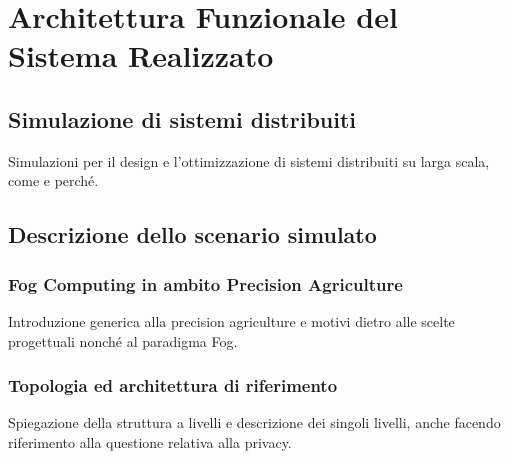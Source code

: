 \chapter{Architettura Funzionale del Sistema Realizzato}	

\section{Simulazione di sistemi distribuiti}

Simulazioni per il design e l'ottimizzazione di sistemi distribuiti su larga scala, come e perché.

\section{Descrizione dello scenario simulato}

\subsection{Fog Computing in ambito Precision Agriculture}

Introduzione generica alla precision agriculture e motivi dietro alle scelte progettuali nonché al paradigma Fog.

\subsection{Topologia ed architettura di riferimento}

Spiegazione della struttura a livelli e descrizione dei singoli livelli, anche facendo riferimento alla questione relativa alla privacy.